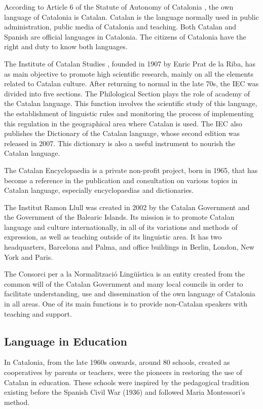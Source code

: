 \begin{multicols}{2}
According to Article 6 of the Statute of Autonomy of Catalonia \cite{CAT-estatut}, the own language of Catalonia is Catalan. Catalan is the language normally used in public administration, public media of Catalonia and teaching. Both Catalan and Spanish are official languages in Catalonia. The citizens of Catalonia have the right and duty to know both languages.

The Institute of Catalan Studies \cite{CAT-IEC}, founded in 1907 by Enric Prat de la Riba, has as main objective to promote high scientific research, mainly on all the elements related to Catalan culture. After returning to normal in the late 70s, the IEC was divided into five sections. The Philological Section plays the role of academy of the Catalan language. This function involves the scientific study of this language, the establishment of linguistic rules and monitoring the process of implementing this regulation in the geographical area where Catalan is used. The IEC also publishes the Dictionary of the Catalan language, whose second edition was released in 2007. This dictionary is also a useful instrument to nourish the Catalan language.

The Catalan Encyclopaedia \cite{CAT-enciclopedia} is a private non-profit project, born in 1965, that has become a reference in the publication and consultation on various topics in Catalan language, especially encyclopaedias and dictionaries.

The Institut Ramon Llull \cite{CAT-llull} was created in 2002 by the Catalan Government and the Government of the Balearic Islands. Its mission is to promote Catalan language and culture internationally, in all of its variations and methods of expression, as well as teaching outside of its linguistic area. It has two headquarters, Barcelona and Palma, and office buildings in Berlin, London, New York and Paris.

The Consorci per a la Normalització Lingüística \cite{CAT-cpnl} is an entity created from the common will of the Catalan Government and many local councils in order to facilitate understanding, use and dissemination of the own language of Catalonia in all areas. One of its main functions is to provide non-Catalan speakers with teaching and support.

\subsection{Language in Education}

In Catalonia, from the late 1960s onwards, around 80 schools, created as cooperatives by parents or teachers, were the pioneers in restoring the use of Catalan in education. These schools were inspired by the pedagogical tradition existing before the Spanish Civil War (1936) and followed Maria Montessori's method.


\end{multicols}
